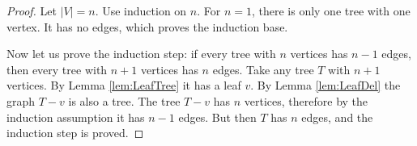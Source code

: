 \begin{proof}
Let $|V| = n$.
Use induction on $n$.
For $n=1$, there is only one tree with one vertex.
It has no edges, which proves the induction base.

Now let us prove the induction step: if every tree with $n$ vertices has $n-1$ edges, then every tree with $n+1$ vertices has $n$ edges.
Take any tree $T$ with $n+1$ vertices.
By Lemma \ref{lem:LeafTree} it has a leaf $v$.
By Lemma \ref{lem:LeafDel} the graph $T - v$ is also a tree.
The tree $T - v$ has $n$ vertices, therefore by the induction assumption it has $n-1$ edges.
But then $T$ has $n$ edges, and the induction step is proved.
\end{proof}
